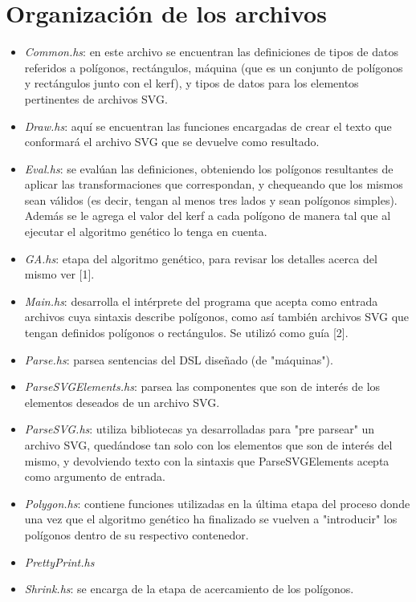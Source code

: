 \documentclass[a4paper,10pt]{article}
\begin{document}
\section*{Organización de los archivos}
\begin{itemize}
    \item \textit{Common.hs}: en este archivo se encuentran las definiciones de tipos de datos referidos a
    polígonos, rectángulos, máquina (que es un conjunto de polígonos y rectángulos junto con el kerf), y tipos
    de datos para los elementos pertinentes de archivos SVG.
    \item \textit{Draw.hs}: aquí se encuentran las funciones encargadas de crear el texto que conformará el
    archivo SVG que se devuelve como resultado.
    \item \textit{Eval.hs}: se evalúan las definiciones, obteniendo los polígonos resultantes de aplicar las
    transformaciones que correspondan, y chequeando que los mismos sean válidos (es decir, tengan al menos
    tres lados y sean polígonos simples). Además se le agrega el valor del kerf a cada polígono de manera tal
    que al ejecutar el algoritmo genético lo tenga en cuenta.
    \item \textit{GA.hs}: etapa del algoritmo genético, para revisar los detalles acerca del mismo ver [1].
    \item \textit{Main.hs}: desarrolla el intérprete del programa que acepta como entrada archivos cuya
    sintaxis describe polígonos, como así también archivos SVG que tengan definidos polígonos o rectángulos.
    Se utilizó como guía [2].
    \item \textit{Parse.hs}: parsea sentencias del DSL diseñado (de "máquinas").
    \item \textit{ParseSVGElements.hs}: parsea las componentes que son de interés de los elementos deseados de
    un archivo SVG.
    \item \textit{ParseSVG.hs}: utiliza bibliotecas ya desarrolladas para "pre parsear" un archivo SVG,
    quedándose tan solo con los elementos que son de interés del mismo, y devolviendo texto con la sintaxis
    que ParseSVGElements acepta como argumento de entrada.
    \item \textit{Polygon.hs}: contiene funciones utilizadas en la última etapa del proceso donde una vez que
    el algoritmo genético ha finalizado se vuelven a "introducir" los polígonos dentro de su respectivo
    contenedor.
    \item \textit{PrettyPrint.hs}
    \item \textit{Shrink.hs}: se encarga de la etapa de acercamiento de los polígonos.
\end{itemize}
\end{document}
